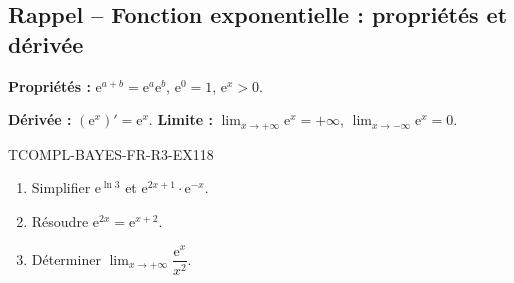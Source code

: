 

\subsection*{Rappel -- Fonction exponentielle : propriétés et dérivée}

\textbf{Propriétés :} $\mathrm{e}^{a+b} = \mathrm{e}^a \mathrm{e}^b$, $\mathrm{e}^0 = 1$, $\mathrm{e}^x > 0$.

\textbf{Dérivée :} $(\mathrm{e}^x)' = \mathrm{e}^x$. \textbf{Limite :} $\lim_{x \to +\infty} \mathrm{e}^x = +\infty$, $\lim_{x \to -\infty} \mathrm{e}^x = 0$.

\begin{exercice}{TCOMPL-BAYES-FR-R3-EX1}{1}{8}
\begin{enumerate}
  \item Simplifier $\mathrm{e}^{\ln 3}$ et $\mathrm{e}^{2x + 1} \cdot \mathrm{e}^{-x}$.
  \item Résoudre $\mathrm{e}^{2x} = \mathrm{e}^{x+2}$.
  \item Déterminer $\lim_{x \to +\infty} \dfrac{\mathrm{e}^x}{x^2}$.
\end{enumerate}
\end{exercice}

